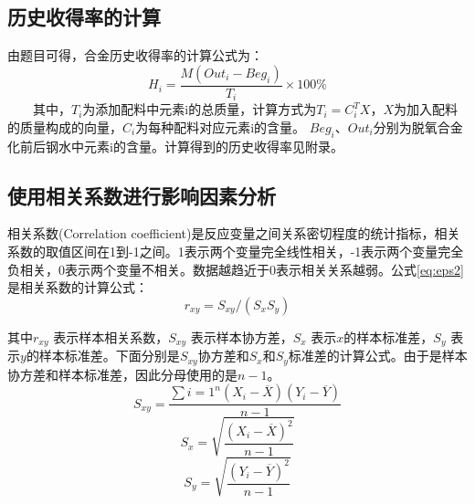 \documentclass{xcumcmart}
\begin{document}
\subsection{历史收得率的计算}
由题目可得，合金历史收得率的计算公式为：
\begin{equation} \label{eq:eps1}
    H_i=\frac{M(Out_i-Beg_i)}{T_i}\times 100\%
\end{equation}
　　其中，$T_i$为添加配料中元素i的总质量，计算方式为$T_i=C_{i}^{T}X$，$X$为加入配料的质量构成的向量，$C_i$为每种配料对应元素i的含量。
$Beg_i$、$Out_i$分别为脱氧合金化前后钢水中元素i的含量。计算得到的历史收得率见附录。

\subsection{使用相关系数进行影响因素分析}
相关系数(Correlation coefficient)是反应变量之间关系密切程度的统计指标，相关系数的取值区间在1到-1之间。1表示两个变量完全线性相关，-1表示两个变量完全负相关，0表示两个变量不相关。数据越趋近于0表示相关关系越弱。公式\ref{eq:eps2}是相关系数的计算公式：
\begin{equation} \label{eq:eps2}
    r_{xy}=S_{xy}/(S_xS_y )
\end{equation}

其中$r_{xy}$ 表示样本相关系数，$S_{xy}$ 表示样本协方差，$S_x$ 表示$x$的样本标准差，$S_y$  表示$y$的样本标准差。下面分别是$S_{xy}$协方差和$S_x$和$S_y$标准差的计算公式。由于是样本协方差和样本标准差，因此分母使用的是$n-1$。
\[S_{xy}=\frac{\sum{i=1}^n(X_i-\overline{X})(Y_i-\overline{Y})}{n-1}\]
\[S_x=\sqrt{\frac{(X_i-\overline{X})^2}{n-1}}\]
\[S_y=\sqrt{\frac{(Y_i-\overline{Y})^2}{n-1}}\]
\end{document}
